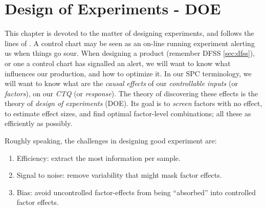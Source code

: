 \chapter[DOE]{Design of Experiments - DOE}

This chapter is devoted to the matter of designing experiments, and follows the lines of \cite{cox_theory_2000}.
A control chart may be seen as an on-line running experiment alerting us when things go sour. 
When designing a product (remember DFSS \ref{sec:dfss}), or one a control chart has signalled an alert, we will want to know what influences our production, and how to optimize it.
In our SPC terminology, we will want to know what are the \emph{causal} \emph{effects} of our \emph{controllable inputs} (or \emph{factors}), on our \emph{CTQ} (or \emph{response}). 
The theory of discovering these effects is the theory of \emph{design of experiments} (DOE).
Its goal is to \emph{screen} factors with no effect, to estimate effect sizes, and find optimal factor-level combinations; all these as efficiently as possibly.



Roughly speaking, the challenges in designing good experiment are:
\begin{enumerate}
\item Efficiency: extract the most information per sample. 
\item Signal to noise: remove variability that might mask factor effects.
\item Bias: avoid uncontrolled factor-effects from being ``absorbed'' into controlled factor effects.
\end{enumerate}





